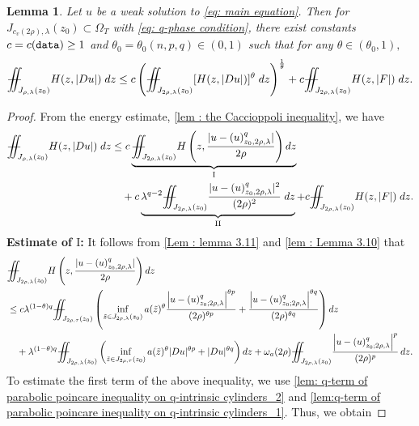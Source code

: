 \documentclass[11pt,oneside, english,reqno,twoside a4paper]{amsart}
\newtheorem{lemma}{Lemma}[section]
\theoremstyle{definition}
\numberwithin{theorem}{section}
\numberwithin{equation}{section}
\newcommand{\la}{\lambda}
\newcommand{\iintss}{{\int\hspace{-0.28cm}\int}}
\newcommand{ \miints }{{\iintss\hspace{-0.56cm} -\hspace{-0.15cm}-}}
\newcommand{\miint}[1]{{\miints_{\hspace{-0.13cm}#1}}}
\begin{document}
\begin{lemma}\label{lem : lemma 3.12}
    Let $u$ be a weak solution to \eqref{eq: main equation}. Then for $J_{c_v(2 \rho),\lambda}\left(z_0\right) \subset \Omega_T$ with \eqref{eq: q-phase condition}, there exist constants $c=c(\textnormal{\texttt{data}}) \geq 1$ and $\theta_0=\theta_0(n,p,q) \in (0,1)$ such that for any $\theta\in (\theta_0,1),$
    \begin{align*}
        \miint{J_{\rho,\lambda}(z_0)} H(z,|Du|)\; dz\leq c \left(\miint{J_{2\rho,\lambda}(z_0)} [H(z,|Du|)]^\theta\;dz\right)^\frac{1}{\theta}+c\miint{J_{2\rho,\lambda}(z_0)} H(z,|F|)\; dz.
    \end{align*}
\end{lemma}
\begin{proof}
From the energy estimate, \cref{lem : the Caccioppoli inequality}, we have
\begin{align*}
\miint{J_{\rho, \lambda}(z_0)}H(z,|Du|)\;dz
& \leq c\underbrace{\miint{J_{2\rho, \lambda}(z_0)}  H\left(z,\frac{|u-(u)^q_{z_0, 2\rho, \lambda}|}{2\rho}\right) dz}_{\mathrm{I}}\\
&\quad + c \underbrace{\la^{q -2}\miint{J_{2\rho, \lambda}(z_0)}\frac{|u-(u)^q_{z_0, 2\rho, \lambda}|^2}{(2\rho)^2}\;dz}_{\mathrm{II}} +c\miint{J_{2\rho, \lambda}(z_0)} H(z,|F|) \;dz.   
\end{align*}
\textbf{Estimate of $\mathrm{I}$:} It follows from  \cref{Lem : lemma 3.11} and \cref{lem : Lemma 3.10} that
\begin{align*}
&\miint{J_{2\rho, \lambda}(z_0)}  H\left(z,\frac{|u-(u)^q_{z_0, 2\rho, \lambda}|}{2\rho}\right) dz \\
&\leq c\lambda^{(1-\theta)q} \miint{J_{2\rho, \tau}(z_0)}\left(\inf_{\tilde{z} \in J_{2\rho, \lambda}(z_0)}a(\tilde{z})^{\theta}\frac{\left|u-(u)^q_{z_0 ; 2 \rho,\lambda}\right|^{\theta p}}{(2 \rho)^{\theta p}}+ \frac{\left|u-(u)^q_{z_0 ; 2 \rho,\lambda}\right|^{\theta q}}{(2 \rho)^{\theta q}} \right) dz \\
&\quad +\lambda^{(1-\theta)q}\miint{J_{2\rho, \lambda}(z_0)}\left(\inf_{\tilde{z}\in J_{2\rho, \tau}(z_0)}a(\tilde{z})^{\theta}|Du|^{\theta p}+|Du|^{\theta q}\right) dz+\omega_a(2\rho)\miint{J_{2\rho, \lambda}(z_0)}\frac{\left|u-(u)^q_{z_0 ; 2 \rho,\lambda}\right|^p}{(2 \rho)^p}\,dz.
\end{align*}
To estimate the first term of the above inequality, we use \cref{lem: q-term of parabolic poincare inequality on q-intrinsic cylinders_2} and  \cref{lem:q-term of parabolic poincare inequality on q-intrinsic cylinders_1}. Thus, we obtain

\end{proof}
\end{document}
